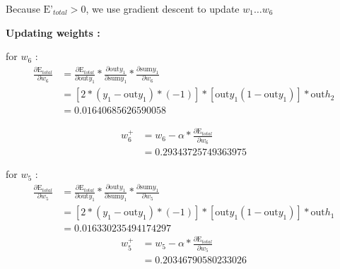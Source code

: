 \documentclass[a4paper, article, oneside, USenglish, IN5460]{memoir}
\begin{document}
{\newline Because $\text{E'}_{total} >0 $, we use gradient descent to update $w_1 \ldots w_6 $



\newline
\textbf{Updating weights :}

for $w_6$ :
\begin{equation}
\begin{aligned}
\frac{\partial \text{E}_{total}  }{\partial w_6} &= 
\frac{\partial \text{E}_{total}}{\partial \text{out}y_1} *\frac{\partial  \text{out}y_1}{\partial \text{sum}y_1}*\frac{\partial \text{sum}y_1}{\partial  w_6}\\
&= [2*(y_1 -\text{out}y_1)*(-1)] * [\text{out}y_1(1-\text{out}y_1)] *\text{out}h_2 \\
& = 0.01640685626590058
\end{aligned}
\end{equation}


\begin{equation}
\begin{aligned}
w^+_6 &= w_6 - \alpha * \frac{\partial \text{E}_{total}  }{\partial w_6} \\
& =  0.29343725749363975
\end{aligned}
\end{equation}


\newline
for $w_5$ :
\begin{equation}
\begin{aligned}
\frac{\partial \text{E}_{total}  }{\partial w_5} &= \frac{\partial \text{E}_{total}}{\partial \text{out}y_1} *\frac{\partial  \text{out}y_1}{\partial \text{sum}y_1}*\frac{\partial \text{sum}y_1}{\partial  w_5}\\
&=[2*(y_1 -\text{out}y_1)*(-1)] * [\text{out}y_1(1-\text{out}y_1)] *\text{out}h_1 \\
& =  0.016330235494174297

\end{aligned}
\end{equation}
\begin{equation}
\begin{aligned}
w^+_5 &= w_5 - \alpha * \frac{\partial \text{E}_{total}  }{\partial w_5} \\
& = 0.20346790580233026
\end{aligned}
\end{equation}


}
\end{document}
